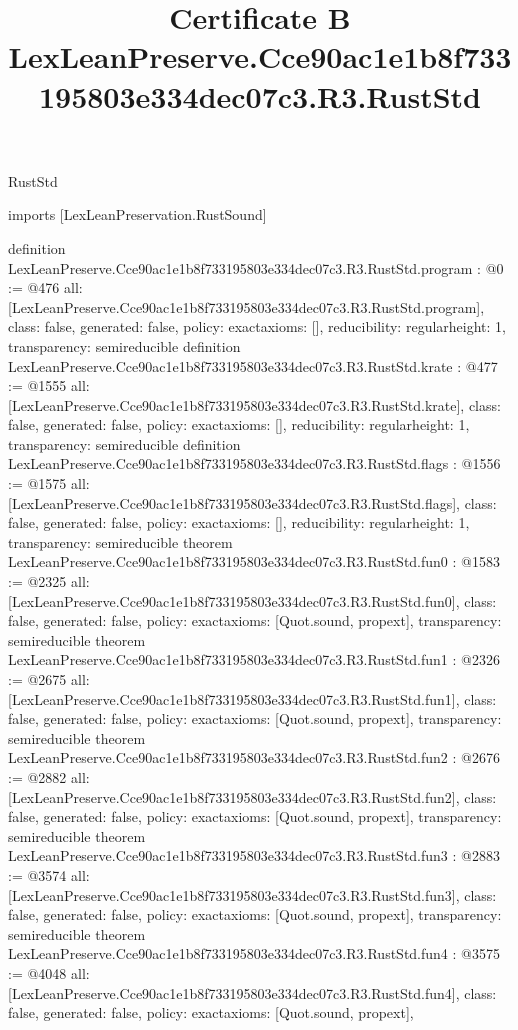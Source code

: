 \begin{lexlean}{RustStd}
\title{Certificate B LexLeanPreserve.Cce90ac1e1b8f733195803e334dec07c3.R3.RustStd}
\begin{coremodule}
imports [LexLeanPreservation.RustSound]

definition LexLeanPreserve.Cce90ac1e1b8f733195803e334dec07c3.R3.RustStd.program : @0 := @476 {
  all: [LexLeanPreserve.Cce90ac1e1b8f733195803e334dec07c3.R3.RustStd.program],
  class: false,
  generated: false,
  policy: exact{axioms: []},
  reducibility: regular{height: 1},
  transparency: semireducible
}
definition LexLeanPreserve.Cce90ac1e1b8f733195803e334dec07c3.R3.RustStd.krate : @477 := @1555 {
  all: [LexLeanPreserve.Cce90ac1e1b8f733195803e334dec07c3.R3.RustStd.krate],
  class: false,
  generated: false,
  policy: exact{axioms: []},
  reducibility: regular{height: 1},
  transparency: semireducible
}
definition LexLeanPreserve.Cce90ac1e1b8f733195803e334dec07c3.R3.RustStd.flags : @1556 := @1575 {
  all: [LexLeanPreserve.Cce90ac1e1b8f733195803e334dec07c3.R3.RustStd.flags],
  class: false,
  generated: false,
  policy: exact{axioms: []},
  reducibility: regular{height: 1},
  transparency: semireducible
}
theorem LexLeanPreserve.Cce90ac1e1b8f733195803e334dec07c3.R3.RustStd.fun0 : @1583 := @2325 {
  all: [LexLeanPreserve.Cce90ac1e1b8f733195803e334dec07c3.R3.RustStd.fun0],
  class: false,
  generated: false,
  policy: exact{axioms: [Quot.sound, propext]},
  transparency: semireducible
}
theorem LexLeanPreserve.Cce90ac1e1b8f733195803e334dec07c3.R3.RustStd.fun1 : @2326 := @2675 {
  all: [LexLeanPreserve.Cce90ac1e1b8f733195803e334dec07c3.R3.RustStd.fun1],
  class: false,
  generated: false,
  policy: exact{axioms: [Quot.sound, propext]},
  transparency: semireducible
}
theorem LexLeanPreserve.Cce90ac1e1b8f733195803e334dec07c3.R3.RustStd.fun2 : @2676 := @2882 {
  all: [LexLeanPreserve.Cce90ac1e1b8f733195803e334dec07c3.R3.RustStd.fun2],
  class: false,
  generated: false,
  policy: exact{axioms: [Quot.sound, propext]},
  transparency: semireducible
}
theorem LexLeanPreserve.Cce90ac1e1b8f733195803e334dec07c3.R3.RustStd.fun3 : @2883 := @3574 {
  all: [LexLeanPreserve.Cce90ac1e1b8f733195803e334dec07c3.R3.RustStd.fun3],
  class: false,
  generated: false,
  policy: exact{axioms: [Quot.sound, propext]},
  transparency: semireducible
}
theorem LexLeanPreserve.Cce90ac1e1b8f733195803e334dec07c3.R3.RustStd.fun4 : @3575 := @4048 {
  all: [LexLeanPreserve.Cce90ac1e1b8f733195803e334dec07c3.R3.RustStd.fun4],
  class: false,
  generated: false,
  policy: exact{axioms: [Quot.sound, propext]},
}
\end{coremodule}
\end{lexlean}
